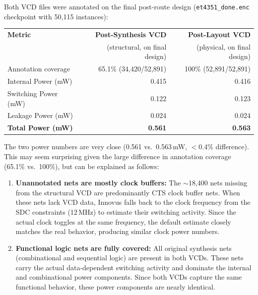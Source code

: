 \documentclass{article}
\begin{document}
\begin{tcolorbox}[colback=white, colframe=black, width=\textwidth, title=Answer 3.3]

Both VCD files were annotated on the final post-route design (\texttt{et4351\_done.enc} checkpoint with 50{,}115 instances):

\vspace{0.2cm}

\begin{tabular}{@{}lrr@{}}
\toprule
\textbf{Metric} & \textbf{Post-Synthesis VCD} & \textbf{Post-Layout VCD} \\
 & (structural, on final design) & (physical, on final design) \\
\midrule
Annotation coverage   & 65.1\% (34{,}420/52{,}891)  & 100\% (52{,}891/52{,}891) \\
Internal Power (mW)   & 0.415                        & 0.416 \\
Switching Power (mW)  & 0.122                        & 0.123 \\
Leakage Power (mW)    & 0.024                        & 0.024 \\
\textbf{Total Power (mW)} & \textbf{0.561}           & \textbf{0.563} \\
\bottomrule
\end{tabular}

\vspace{0.3cm}

The two power numbers are very close (0.561 vs.\ 0.563\,mW, $<$0.4\% difference). This may seem surprising given the large difference in annotation coverage (65.1\% vs.\ 100\%), but can be explained as follows:

\begin{enumerate}
\item \textbf{Unannotated nets are mostly clock buffers:} The $\sim$18{,}400 nets missing from the structural VCD are predominantly CTS clock buffer nets. When these nets lack VCD data, Innovus falls back to the clock frequency from the SDC constraints (12\,MHz) to estimate their switching activity. Since the actual clock toggles at the same frequency, the default estimate closely matches the real behavior, producing similar clock power numbers.

\item \textbf{Functional logic nets are fully covered:} All original synthesis nets (combinational and sequential logic) are present in both VCDs. These nets carry the actual data-dependent switching activity and dominate the internal and combinational power components. Since both VCDs capture the same functional behavior, these power components are nearly identical.


\end{enumerate}
\end{tcolorbox}
\end{document}
